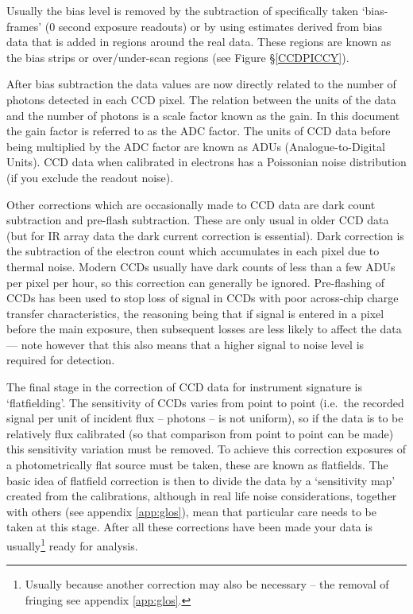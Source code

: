 \documentclass[twoside,11pt]{article}
\newcommand{\hyperref}[4]{#2\ref{#4}#3}
\renewcommand{\_}{\texttt{\symbol{95}}}
\begin{document}
Usually the bias level is removed by the subtraction of specifically
taken `bias-frames' ($0$ second exposure readouts) or by using
estimates derived from bias data that is added in regions around
the real data. These regions are known as the bias strips or
over/under-scan regions (see \hyperref{this figure}{Figure
\S}{}{CCDPICCY}).

After bias subtraction the data values are now directly related to the
number of photons detected in each CCD pixel.
The relation between the units of the data and the number of photons
is a scale factor known as the gain.
In this document the gain factor is referred to as the ADC factor.
The units of CCD data before being multiplied by the ADC factor are
known as ADUs (Analogue-to-Digital Units).
CCD data when calibrated in electrons has a Poissonian noise distribution
(if you exclude the readout noise).

Other corrections which are occasionally made to CCD data are
dark count subtraction and pre-flash subtraction.
These are only usual in older CCD data (but for IR array data the dark
current correction is essential).
Dark correction is the subtraction of the electron count which
accumulates in each pixel due to thermal noise.
Modern CCDs usually have dark counts of less than a few ADUs per pixel
per hour, so this correction can generally be ignored.
Pre-flashing of CCDs has been used to stop loss of signal in CCDs with
poor across-chip charge transfer characteristics, the reasoning being
that if signal is entered in a pixel before the main exposure, then
subsequent losses are less likely to affect the data --- note however
that this also means that a higher signal to noise level is required
for detection.

The final stage in the correction of CCD data for instrument signature
is `flatfielding'.
The sensitivity of CCDs varies from point to point (i.e.\ the recorded
signal per unit of incident flux -- photons -- is not uniform), so if
the data is to be relatively flux calibrated (so that comparison from
point to point can be made) this sensitivity variation must be
removed.
To achieve this correction exposures of a photometrically flat source
must be taken, these are known as flatfields.
The basic idea of flatfield correction is then to divide the data by a
`sensitivity map' created from the calibrations, although in real life
noise considerations, together with others (see appendix \ref{app:glos}),
mean that particular care needs to be taken at this stage.
After all these corrections have been made your data is
usually\footnote{Usually because another correction may also be
necessary -- the removal of fringing see appendix \ref{app:glos}.}
ready for analysis.
\end{document}
